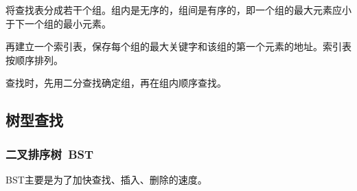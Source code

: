 \documentclass[12pt, a4paper, oneside]{ctexart}
\begin{document}
将查找表分成若干个组。组内是无序的，组间是有序的，即一个组的最大元素应小于下一个组的最小元素。

再建立一个索引表，保存每个组的最大关键字和该组的第一个元素的地址。索引表按顺序排列。

查找时，先用二分查找确定组，再在组内顺序查找。

\subsection{树型查找}

\subsubsection{二叉排序树\ BST}

BST主要是为了加快查找、插入、删除的速度。
\end{document}
